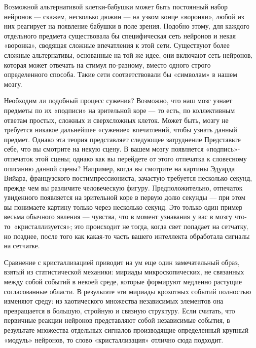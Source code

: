\documentclass[../main.tex]{subfiles}
\begin{document}
Возможной альтернативой клетки-бабушки может быть постоянный набор нейронов --- скажем, несколько дюжин --- на узком конце «воронки», любой из них реагирует на появление бабушки в поле зрения. Подобно этому, для каждого отдельного предмета существовала бы специфическая сеть нейронов и некая «воронка», сводящая сложные впечатления к этой сети. Существуют более сложные альтернативы, основанные на той же идее, они включают сеть нейронов, которая может отвечать на стимул по-разному, вместо одного строго определенного способа. Такие сети соответствовали бы «символам» в нашем мозгу.

Необходим ли подобный процесс сужения? Возможно, что наш мозг узнает предметы по их «подписи» на зрительной коре --- то есть, по коллективным ответам простых, сложных и сверхсложных клеток. Может быть, мозгу не требуется никакое дальнейшее «сужение» впечатлений, чтобы узнать данный предмет. Однако эта теория представляет следующее затруднение Представьте себе, что вы смотрите на некую сцену. В вашем мозгу появляется «подпись»-отпечаток этой сцены; однако как вы перейдете от этого отпечатка к словесному описанию данной сцены? Например, когда вы смотрите на картины Эдуарда Вийара, французского постимпрессиониста, зачастую требуется несколько секунд, прежде чем вы различите человеческую фигуру. Предположительно, отпечаток увиденного появляется на зрительной коре в первую долю секунды --- при этом вы понимаете картину только через несколько секунд. Это только один пример весьма обычного явления --- чувства, что в момент узнавания у вас в мозгу что-то~«кристаллизуется»; это происходит не тогда, когда свет попадает на сетчатку, но позднее, после того как какая-то часть вашего интеллекта обработала сигналы на сетчатке.

Сравнение с кристаллизацией приводит на ум еще один замечательный образ, взятый из статистической механики: мириады микроскопических, не связанных между собой событий в некоей среде, которые формируют медленно растущие согласованные области. В результате эти мириады крохотных событий полностью изменяют среду: из хаотического множества независимых элементов она превращается в большую, стройную и связную структуру. Если считать, что первичные реакции нейронов представляют собой независимые события, в результате множества отдельных сигналов производящие определенный крупный «модуль» нейронов, то слово «кристаллизация» отлично сюда подходит.
\end{document}
